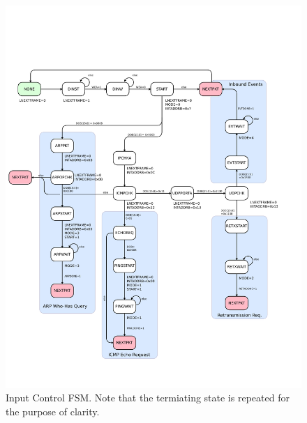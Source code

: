 \begin{figure}
\begin{centering}
\includegraphics[scale=0.8]{inputcontrol.fsm.svg}
\end{centering}
\caption{Input Control FSM. Note that the termiating  state is repeated for the purpose of clarity. }
\label{inputcontrol.fsm}
\end{figure}


